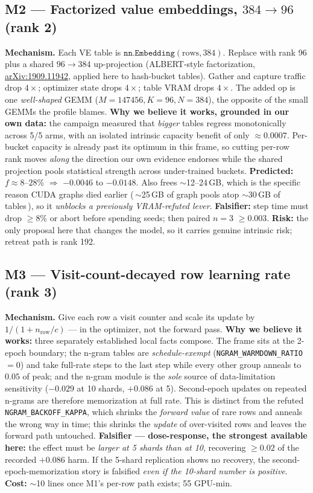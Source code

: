 \documentclass{article}
\begin{document}
\subsection{M2 --- Factorized value embeddings, $384\to96$ (rank 2)}
\textbf{Mechanism.} Each VE table is $\texttt{nn.Embedding}(\text{rows},384)$. Replace with rank 96 plus a shared $96\!\to\!384$ up-projection (ALBERT-style factorization, \href{https://arxiv.org/abs/1909.11942}{arXiv:1909.11942}, applied here to hash-bucket tables). Gather and capture traffic drop $4\times$; optimizer state drops $4\times$; table VRAM drops $4\times$. The added op is one \emph{well-shaped} GEMM ($M{=}147456,K{=}96,N{=}384$), the opposite of the small GEMMs the profile blames.
\textbf{Why we believe it works, grounded in our own data:} the campaign measured that \emph{bigger} tables regress monotonically across 5/5 arms, with an isolated intrinsic capacity benefit of only $\approx$$0.0007$. Per-bucket capacity is already past its optimum in this frame, so cutting per-row rank moves \emph{along} the direction our own evidence endorses while the shared projection pools statistical strength across under-trained buckets.
\textbf{Predicted:} $f\approx8$--$28\%$ $\Rightarrow$ $-0.0046$ to $-0.0148$. Also frees $\sim$12--24\,GB, which is the specific reason CUDA graphs died earlier (\,$\sim$25\,GB of graph pools atop $\sim$30\,GB of tables\,), so it \emph{unblocks a previously VRAM-refuted lever}.
\textbf{Falsifier:} step time must drop $\ge$8\% or abort before spending seeds; then paired $n{=}3$ $\ge$$0.003$. \textbf{Risk:} the only proposal here that changes the model, so it carries genuine intrinsic risk; retreat path is rank 192.

\subsection{M3 --- Visit-count-decayed row learning rate (rank 3)}
\textbf{Mechanism.} Give each row a visit counter and scale its update by $1/(1+n_\mathrm{row}/c)$ --- in the optimizer, not the forward pass.
\textbf{Why we believe it works:} three separately established local facts compose. The frame sits at the 2-epoch boundary; the n-gram tables are \emph{schedule-exempt} (\texttt{NGRAM\_WARMDOWN\_RATIO}$=0$) and take full-rate steps to the last step while every other group anneals to $0.05$ of peak; and the n-gram module is the \emph{sole} source of data-limitation sensitivity ($-0.029$ at 10 shards, $+0.086$ at 5). Second-epoch updates on repeated n-grams are therefore memorization at full rate. This is distinct from the refuted \texttt{NGRAM\_BACKOFF\_KAPPA}, which shrinks the \emph{forward value} of rare rows and anneals the wrong way in time; this shrinks the \emph{update} of over-visited rows and leaves the forward path untouched.
\textbf{Falsifier --- dose-response, the strongest available here:} the effect must be \emph{larger at 5 shards than at 10}, recovering $\ge$$0.02$ of the recorded $+0.086$ harm. If the 5-shard replication shows no recovery, the second-epoch-memorization story is falsified \emph{even if the 10-shard number is positive}. \textbf{Cost:} $\sim$10 lines once M1's per-row path exists; 55 GPU-min.
\end{document}

